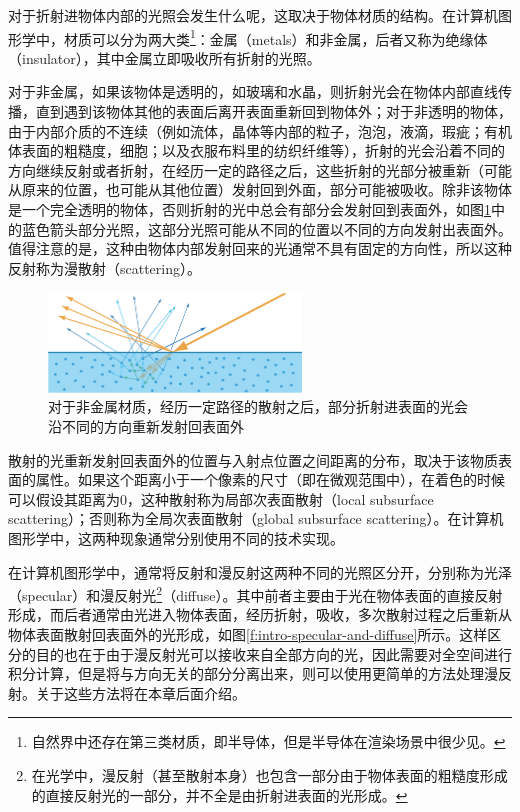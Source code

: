 对于折射进物体内部的光照会发生什么呢，这取决于物体材质的结构。在计算机图形学中，材质可以分为两大类\footnote{自然界中还存在第三类材质，即半导体，但是半导体在渲染场景中很少见。}：金属（metals）和非金属，后者又称为绝缘体（insulator），其中金属立即吸收所有折射的光照。

对于非金属，如果该物体是透明的，如玻璃和水晶，则折射光会在物体内部直线传播，直到遇到该物体其他的表面后离开表面重新回到物体外；对于非透明的物体，由于内部介质的不连续（例如流体，晶体等内部的粒子，泡泡，液滴，瑕疵；有机体表面的粗糙度，细胞；以及衣服布料里的纺织纤维等），折射的光会沿着不同的方向继续反射或者折射，在经历一定的路径之后，这些折射的光部分被重新（可能从原来的位置，也可能从其他位置）发射回到外面，部分可能被吸收。除非该物体是一个完全透明的物体，否则折射的光中总会有部分会发射回到表面外，如图\ref{f:intro-refraction}中的蓝色箭头部分光照，这部分光照可能从不同的位置以不同的方向发射出表面外。值得注意的是，这种由物体内部发射回来的光通常不具有固定的方向性，所以这种反射称为漫散射（scattering）。

\begin{figure}
\sidecaption
	\includegraphics[width=0.6\textwidth]{figures/intro/ray-optics-5}
	\caption{对于非金属材质，经历一定路径的散射之后，部分折射进表面的光会沿不同的方向重新发射回表面外}
	\label{f:intro-refraction} 
\end{figure}

散射的光重新发射回表面外的位置与入射点位置之间距离的分布，取决于该物质表面的属性。如果这个距离小于一个像素的尺寸（即在微观范围中），在着色的时候可以假设其距离为$0$，这种散射称为局部次表面散射（local subsurface scattering）；否则称为全局次表面散射（global subsurface scattering）。在计算机图形学中，这两种现象通常分别使用不同的技术实现。

在计算机图形学中，通常将反射和漫反射这两种不同的光照区分开，分别称为光泽（specular）和漫反射光\footnote{在光学中，漫反射（甚至散射本身）也包含一部分由于物体表面的粗糙度形成的直接反射光的一部分，并不全是由折射进表面的光形成。}（diffuse）。其中前者主要由于光在物体表面的直接反射形成，而后者通常由光进入物体表面，经历折射，吸收，多次散射过程之后重新从物体表面散射回表面外的光形成，如图\ref{f:intro-specular-and-diffuse}所示。这样区分的目的也在于由于漫反射光可以接收来自全部方向的光，因此需要对全空间进行积分计算，但是将与方向无关的部分分离出来，则可以使用更简单的方法处理漫反射。关于这些方法将在本章后面介绍。

